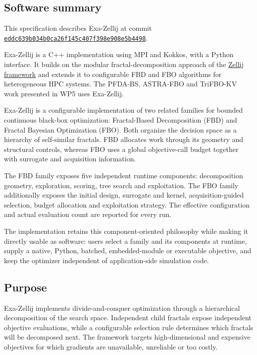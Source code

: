 \subsection{Software summary}
\label{sec:Zellij:summary}

This specification describes Exa-Zellij at commit
\href{https://github.com/MehdielKhadiri/Exa-Zellij/tree/eddc639b034b0ca26f145c407f398e908e5b4498}{\texttt{eddc639b034b0ca26f145c407f398e908e5b4498}}.

Exa-Zellij is a C++ implementation using MPI and Kokkos, with a Python
interface. It builds on the modular fractal-decomposition approach of the
\href{https://github.com/ThomasFirmin/zellij}{Zellij framework}
and extends it to configurable FBD and FBO algorithms for heterogeneous HPC
systems. The PFDA-BS, ASTRA-FBO and TriFBO-KV work presented in WP5 uses
Exa-Zellij.

Exa-Zellij is a configurable implementation of two related families
for bounded continuous black-box optimization: Fractal-Based Decomposition
(FBD) and Fractal Bayesian Optimization (FBO). Both organize the decision
space as a hierarchy of self-similar fractals. FBD allocates work through its
geometry and structural controls, whereas FBO uses a global objective-call
budget together with surrogate and acquisition information.

The FBD family exposes five independent runtime components:
decomposition geometry, exploration, scoring, tree search and exploitation.
The FBO family additionally exposes the initial design, surrogate and
kernel,
acquisition-guided selection, budget allocation and exploitation strategy.
The effective configuration and actual evaluation count are reported for
every run.

The implementation retains this component-oriented philosophy while
making it directly usable as software: users select a family and its
components at runtime, supply a native, Python, batched, embedded-module or
executable objective, and keep the optimizer independent of application-side
simulation code.

\subsection{Purpose}
\label{sec:Zellij:purpose}

Exa-Zellij implements divide-and-conquer optimization through a
hierarchical decomposition of the search space. Independent child fractals
expose independent objective evaluations, while a configurable selection
rule
determines which fractals will be decomposed next. The framework targets
high-dimensional and expensive objectives for which gradients are
unavailable,
unreliable or too costly.

